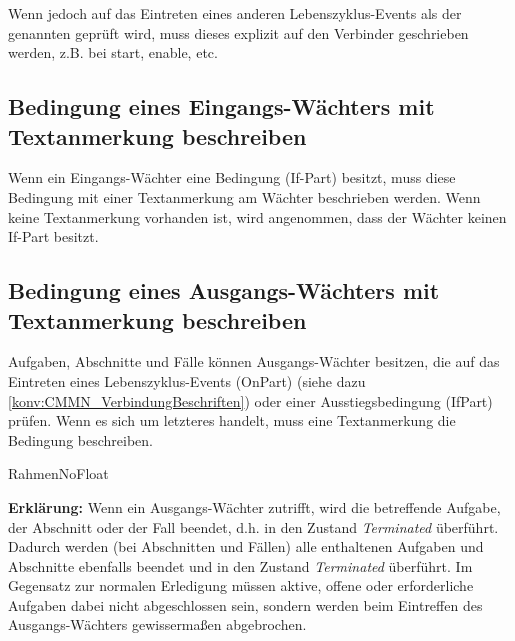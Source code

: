 \documentclass[12pt,report]{snetTeaching}
\begin{document}
Wenn jedoch auf das Eintreten eines anderen Lebenszyklus-Events als der genannten geprüft wird, muss dieses explizit auf den Verbinder geschrieben werden, z.B. bei start, enable, etc.










\subsection{Bedingung eines Eingangs-Wächters mit Textanmerkung beschreiben}

Wenn ein Eingangs-Wächter eine Bedingung (If-Part) besitzt, muss diese Bedingung mit einer Textanmerkung am Wächter beschrieben werden. Wenn keine Textanmerkung vorhanden ist, wird angenommen, dass der Wächter keinen If-Part besitzt. 

\begin{RahmenNoFloat}
	\hfill
\end{RahmenNoFloat}


\subsection{Bedingung eines Ausgangs-Wächters mit Textanmerkung beschreiben}

Aufgaben, Abschnitte und Fälle können Ausgangs-Wächter besitzen, die auf das Eintreten eines Lebenszyklus-Events (OnPart) (siehe dazu \ref{konv:CMMN_VerbindungBeschriften}) oder einer Ausstiegsbedingung (IfPart) prüfen. Wenn es sich um letzteres handelt, muss eine Textanmerkung die Bedingung beschreiben.

RahmenNoFloat
\begin{RahmenNoFloat}
	\hfill
\end{RahmenNoFloat}

\textbf{Erklärung:} Wenn ein Ausgangs-Wächter zutrifft, wird die betreffende Aufgabe, der Abschnitt oder der Fall beendet, d.h. in den Zustand \emph{Terminated} überführt. Dadurch werden (bei Abschnitten und Fällen) alle enthaltenen Aufgaben und Abschnitte ebenfalls beendet und in den Zustand \emph{Terminated} überführt. Im Gegensatz zur normalen Erledigung müssen aktive, offene oder erforderliche Aufgaben dabei nicht abgeschlossen sein, sondern werden beim Eintreffen des Ausgangs-Wächters gewissermaßen abgebrochen.
\end{document}

